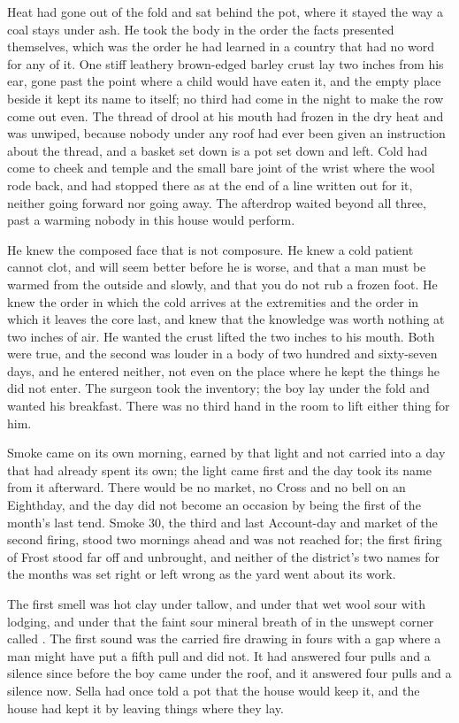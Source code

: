 Heat had gone out of the fold and sat behind the pot, where it stayed the way a coal stays under ash. He took the body in the order the facts presented themselves, which was the order he had learned in a country that had no word for any of it. One stiff leathery brown-edged barley crust lay two inches from his ear, gone past the point where a child would have eaten it, and the empty place beside it kept its name to itself; no third had come in the night to make the row come out even. The thread of drool at his mouth had frozen in the dry heat and was unwiped, because nobody under any roof had ever been given an instruction about the thread, and a basket set down is a pot set down and left. Cold had come to cheek and temple and the small bare joint of the wrist where the wool rode back, and had stopped there as at the end of a line written out for it, neither going forward nor going away. The afterdrop waited beyond all three, past a warming nobody in this house would perform.

He knew the composed face that is not composure. He knew a cold patient cannot clot, and will seem better before he is worse, and that a man must be warmed from the outside and slowly, and that you do not rub a frozen foot. He knew the order in which the cold arrives at the extremities and the order in which it leaves the core last, and knew that the knowledge was worth nothing at two inches of air. He wanted the crust lifted the two inches to his mouth. Both were true, and the second was louder in a body of two hundred and sixty-seven days, and he entered neither, not even on the place where he kept the things he did not enter. The surgeon took the inventory; the boy lay under the fold and wanted his breakfast. There was no third hand in the room to lift either thing for him.

\scenebreak

Smoke came on its own morning, earned by that light and not carried into a day that had already spent its own; the light came first and the day took its name from it afterward. There would be no market, no Cross and no bell on an Eighthday, and the day did not become an occasion by being the first of the month's last tend. Smoke 30, the third and last Account-day and market of the second firing, stood two mornings ahead and was not reached for; the first firing of Frost stood far off and unbrought, and neither of the district's two names for the months was set right or left wrong as the yard went about its work.

The first smell was hot clay under tallow, and under that wet wool sour with lodging, and under that the faint sour mineral breath of  in the unswept corner called . The first sound was the carried fire drawing in fours with a gap where a man might have put a fifth pull and did not. It had answered four pulls and a silence since before the boy came under the roof, and it answered four pulls and a silence now. Sella had once told a pot that the house would keep it, and the house had kept it by leaving things where they lay.

